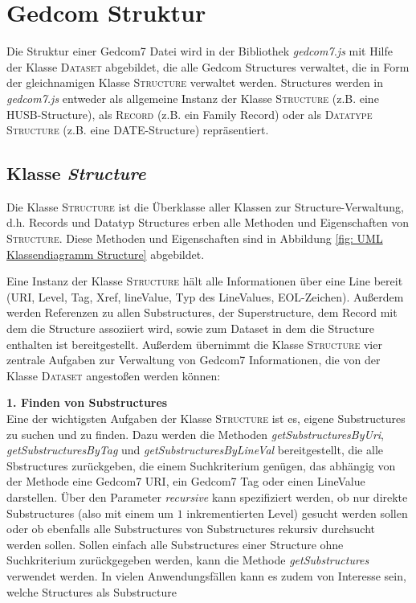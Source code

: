\section{Gedcom Struktur}
\label{sec: Implementierung - Gedcom Struktur}
Die Struktur einer Gedcom7 Datei wird in der Bibliothek \textit{gedcom7.js} mit Hilfe der Klasse \textsc{Dataset} abgebildet, die alle Gedcom Structures verwaltet, die in Form der gleichnamigen Klasse \textsc{Structure} verwaltet werden. Structures werden in \textit{gedcom7.js} entweder als allgemeine Instanz der Klasse \textsc{Structure} (z.B. eine HUSB-Structure), als \textsc{Record} (z.B. ein Family Record) oder als \textsc{Datatype Structure} (z.B. eine DATE-Structure) repräsentiert. 

\subsection{Klasse \textit{Structure}}
\label{subsec: Implementierung - Gedcom Struktur - Klasse Structure}
Die Klasse \textsc{Structure} ist die Überklasse aller Klassen zur Structure-Verwaltung, d.h. Records und Datatyp Structures erben alle Methoden und Eigenschaften von \textsc{Structure}. Diese Methoden und Eigenschaften sind in Abbildung \ref{fig: UML Klassendiagramm Structure} abgebildet. 

Eine Instanz der Klasse \textsc{Structure} hält alle Informationen über eine Line bereit (URI, Level, Tag, Xref, lineValue, Typ des LineValues, EOL-Zeichen). Außerdem werden Referenzen zu allen Substructures, der Superstructure, dem Record mit dem die Structure assoziiert wird, sowie zum Dataset in dem die Structure enthalten ist bereitgestellt. Außerdem übernimmt die Klasse \textsc{Structure} vier zentrale Aufgaben zur Verwaltung von Gedcom7 Informationen, die von der Klasse \textsc{Dataset} angestoßen werden können:

\vspace{1em}
\textbf{1. Finden von Substructures} \vspace{0.5em} \\
Eine der wichtigsten Aufgaben der Klasse \textsc{Structure} ist es, eigene Substructures zu suchen und zu finden. Dazu werden die Methoden \textit{getSubstructuresByUri}, \textit{getSubstructuresByTag} und \textit{getSubstructuresByLineVal} bereitgestellt, die alle Sbstructures zurückgeben, die einem Suchkriterium genügen, das abhängig von der Methode eine Gedcom7 URI, ein Gedcom7 Tag oder einen LineValue darstellen. Über den Parameter \textit{recursive} kann spezifiziert werden, ob nur direkte Substructures (also mit einem um $1$ inkrementierten Level) gesucht werden sollen oder ob ebenfalls alle Substructures von Substructures rekursiv durchsucht werden sollen. Sollen einfach alle Substructures einer Structure ohne Suchkriterium zurückgegeben werden, kann die Methode \textit{getSubstructures} verwendet werden.
In vielen Anwendungsfällen kann es zudem von Interesse sein, welche Structures als Substructure 


